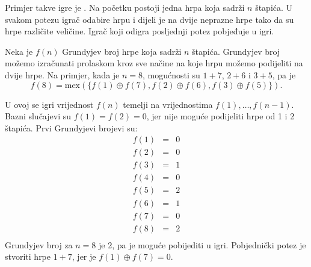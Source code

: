 Primjer takve igre je .
Na početku postoji jedna hrpa koja sadrži $n$ štapića.
U svakom potezu igrač odabire hrpu i dijeli
je na dvije neprazne hrpe tako da su hrpe
različite veličine.
Igrač koji odigra posljednji potez pobjeđuje u igri.

Neka je $f(n)$ Grundyjev broj hrpe
koja sadrži $n$ štapića.
Grundyjev broj možemo izračunati prolaskom
kroz sve načine na koje hrpu možemo podijeliti na
dvije hrpe.
Na primjer, kada je $n=8$, mogućnosti
su $1+7$, $2+6$ i $3+5$, pa je
\[f(8)=\textrm{mex}(\{f(1) \oplus f(7), f(2) \oplus f(6), f(3) \oplus f(5)\}).\]

U ovoj se igri vrijednost $f(n)$ temelji na vrijednostima
$f(1),\ldots,f(n-1)$.
Bazni slučajevi su $f(1)=f(2)=0$,
jer nije moguće podijeliti hrpe
od 1 i 2 štapića.
Prvi Grundyjevi brojevi su:
\[
\begin{array}{lcl}
f(1) & = & 0 \\
f(2) & = & 0 \\
f(3) & = & 1 \\
f(4) & = & 0 \\
f(5) & = & 2 \\
f(6) & = & 1 \\
f(7) & = & 0 \\
f(8) & = & 2 \\
\end{array}
\]
Grundyjev broj za $n=8$ je 2,
pa je moguće pobijediti u igri.
Pobjednički potez je stvoriti hrpe
$1+7$, jer je $f(1) \oplus f(7) = 0$.

